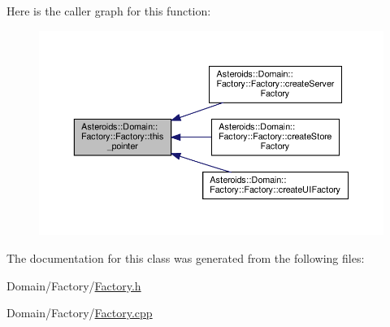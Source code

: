 Here is the caller graph for this function\+:\nopagebreak
\begin{figure}[H]
\begin{center}
\leavevmode
\includegraphics[width=350pt]{classAsteroids_1_1Domain_1_1Factory_1_1Factory_a9fcc5e21b7009846e744564a60b45619_icgraph}
\end{center}
\end{figure}


The documentation for this class was generated from the following files\+:\begin{DoxyCompactItemize}
\item 
Domain/\+Factory/\hyperlink{Factory_8h}{Factory.\+h}\item 
Domain/\+Factory/\hyperlink{Factory_8cpp}{Factory.\+cpp}\end{DoxyCompactItemize}
